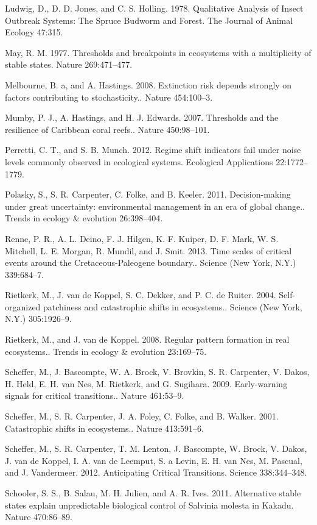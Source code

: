 \documentclass{article}
\begin{document}
Ludwig, D., D. D. Jones, and C. S. Holling. 1978. Qualitative Analysis
of Insect Outbreak Systems: The Spruce Budworm and Forest. The Journal
of Animal Ecology 47:315.

May, R. M. 1977. Thresholds and breakpoints in ecosystems with a
multiplicity of stable states. Nature 269:471--477.

Melbourne, B. a, and A. Hastings. 2008. Extinction risk depends strongly
on factors contributing to stochasticity.. Nature 454:100--3.

Mumby, P. J., A. Hastings, and H. J. Edwards. 2007. Thresholds and the
resilience of Caribbean coral reefs.. Nature 450:98--101.

Perretti, C. T., and S. B. Munch. 2012. Regime shift indicators fail
under noise levels commonly observed in ecological systems. Ecological
Applications 22:1772--1779.

Polasky, S., S. R. Carpenter, C. Folke, and B. Keeler. 2011.
Decision-making under great uncertainty: environmental management in an
era of global change.. Trends in ecology \& evolution 26:398--404.

Renne, P. R., A. L. Deino, F. J. Hilgen, K. F. Kuiper, D. F. Mark, W. S.
Mitchell, L. E. Morgan, R. Mundil, and J. Smit. 2013. Time scales of
critical events around the Cretaceous-Paleogene boundary.. Science (New
York, N.Y.) 339:684--7.

Rietkerk, M., J. van de Koppel, S. C. Dekker, and P. C. de Ruiter. 2004.
Self-organized patchiness and catastrophic shifts in ecosystems..
Science (New York, N.Y.) 305:1926--9.

Rietkerk, M., and J. van de Koppel. 2008. Regular pattern formation in
real ecosystems.. Trends in ecology \& evolution 23:169--75.

Scheffer, M., J. Bascompte, W. A. Brock, V. Brovkin, S. R. Carpenter, V.
Dakos, H. Held, E. H. van Nes, M. Rietkerk, and G. Sugihara. 2009.
Early-warning signals for critical transitions.. Nature 461:53--9.

Scheffer, M., S. R. Carpenter, J. A. Foley, C. Folke, and B. Walker.
2001. Catastrophic shifts in ecosystems.. Nature 413:591--6.

Scheffer, M., S. R. Carpenter, T. M. Lenton, J. Bascompte, W. Brock, V.
Dakos, J. van de Koppel, I. A. van de Leemput, S. a Levin, E. H. van
Nes, M. Pascual, and J. Vandermeer. 2012. Anticipating Critical
Transitions. Science 338:344--348.

Schooler, S. S., B. Salau, M. H. Julien, and A. R. Ives. 2011.
Alternative stable states explain unpredictable biological control of
Salvinia molesta in Kakadu. Nature 470:86--89.
\end{document}
